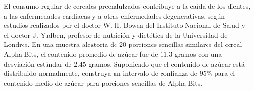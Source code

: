 \begin{enunciado}
 El consumo regular de cereales preendulzados contribuye a la ca\'{\i}da de los dientes, a las enfermedades cardiacas y a otras enfermedades degenerativas, seg\'un estudios realizados por el doctor W. H. Bowen del Instituto Nacional de Salud y el doctor J. Yudben, profesor de nutrici\'on y diet\'etica de la Universidad de Londres.
 En una muestra aleatoria de $20$ porciones sencillas similares del cereal Alpha-Bits, el contenido promedio de az\'ucar fue de $11.3$ gramos con una desviaci\'on est\'andar de $2.45$ gramos.
 Suponiendo que el contenido de az\'ucar est\'a distribuido normalmente, construya un intervalo de confianza de $95\%$ para el contenido medio de az\'ucar para porciones sencillas de Alpha-Bits.
\end{enunciado}

